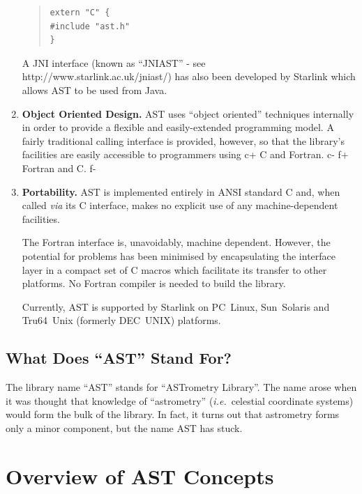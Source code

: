 \documentclass[twoside,11pt]{article}
\newcommand{\htmladdnormallink}[2]{#1}
\begin{document}
\begin{enumerate}
\begin{quote}
\small
\begin{verbatim}
extern "C" {
#include "ast.h"
}
\end{verbatim}
\normalsize
\end{quote}

A JNI interface (known as ``JNIAST'' - see 
\htmladdnormallink{http://www.starlink.ac.uk/jniast/}
{http://www.starlink.ac.uk/jniast/}) has also been developed by Starlink 
which allows AST to be used from Java.

\item {\bf{Object Oriented Design.}}
AST uses ``object oriented'' techniques internally in order to provide
a flexible and easily-extended programming model.  A fairly
traditional calling interface is provided, however, so that the
library's facilities are easily accessible to programmers using
c+
C and Fortran.
c-
f+
Fortran and C.
f-

\item {\bf{Portability.}}
AST is implemented entirely in ANSI standard C and, when called
{\em{via}} its C interface, makes no explicit use of any
machine-dependent facilities.

The Fortran interface is, unavoidably, machine dependent. However, the
potential for problems has been minimised by encapsulating the
interface layer in a compact set of C macros which facilitate its
transfer to other platforms. No Fortran compiler is needed to build
the library.

Currently, AST is supported by Starlink on PC~Linux, Sun~Solaris and
Tru64~Unix (formerly DEC~UNIX) platforms.
\end{enumerate}

\subsection{What Does ``AST'' Stand For?}

The library name ``AST'' stands for ``ASTrometry Library''. The name
arose when it was thought that knowledge of ``astrometry''
({\em{i.e.}}\ celestial coordinate systems) would form the bulk of the
library.  In fact, it turns out that astrometry forms only a minor
component, but the name AST has stuck.

\cleardoublepage
\section{Overview of AST Concepts}
\end{document}
